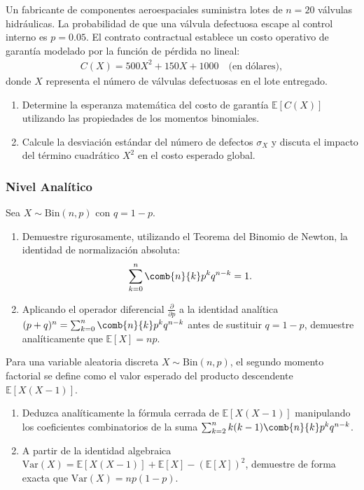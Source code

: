 \begin{problema}
	\label{prob:3.4.6}
	Un fabricante de componentes aeroespaciales suministra lotes de $n = 20$ válvulas hidráulicas. La probabilidad de que una válvula defectuosa escape al control interno es $p = 0.05$. El contrato contractual establece un costo operativo de garantía modelado por la función de pérdida no lineal:
	\begin{align*}
		C(X) = 500 X^2 + 150 X + 1000 \quad \text{(en dólares)},
	\end{align*}
	donde $X$ representa el número de válvulas defectuosas en el lote entregado.
	\begin{enumerate}
		\item Determine la esperanza matemática del costo de garantía $\mathbb{E}[C(X)]$ utilizando las propiedades de los momentos binomiales.
		\item Calcule la desviación estándar del número de defectos $\sigma_X$ y discuta el impacto del término cuadrático $X^2$ en el costo esperado global.
	\end{enumerate}
\end{problema}

\subsubsection*{Nivel Analítico}

\begin{problema}
	\label{prob:3.4.7}
	Sea $X \sim \text{Bin}(n, p)$ con $q = 1-p$.
	\begin{enumerate}
		\item Demuestre rigurosamente, utilizando el Teorema del Binomio de Newton, la identidad de normalización absoluta:
		\begin{align*}
			\sum_{k=0}^n \comb{n}{k} p^k q^{n-k} = 1.
		\end{align*}
		\item Aplicando el operador diferencial $\frac{\partial}{\partial p}$ a la identidad analítica $(p+q)^n = \sum_{k=0}^n \comb{n}{k} p^k q^{n-k}$ antes de sustituir $q=1-p$, demuestre analíticamente que $\mathbb{E}[X] = np$.
	\end{enumerate}
\end{problema}

\begin{problema}
	\label{prob:3.4.8}
	Para una variable aleatoria discreta $X \sim \text{Bin}(n, p)$, el segundo momento factorial se define como el valor esperado del producto descendente $\mathbb{E}[X(X-1)]$.
	\begin{enumerate}
		\item Deduzca analíticamente la fórmula cerrada de $\mathbb{E}[X(X-1)]$ manipulando los coeficientes combinatorios de la suma $\sum_{k=2}^n k(k-1)\comb{n}{k} p^k q^{n-k}$.
		\item A partir de la identidad algebraica $\text{Var}(X) = \mathbb{E}[X(X-1)] + \mathbb{E}[X] - (\mathbb{E}[X])^2$, demuestre de forma exacta que $\text{Var}(X) = np(1-p)$.
	\end{enumerate}
\end{problema}

